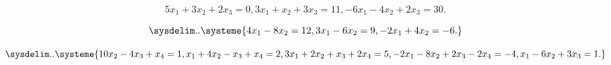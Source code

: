 \documentclass[english,12pt,a4paper]{scrartcl}
\newenvironment{modenumerate}
  {\enumerate\setupmodenumerate}
  {\endenumerate}
\newif\ifmoditem
\newcommand{\setupmodenumerate}{%
  \global\moditemfalse
  \let\origmakelabel\makelabel
  \def\moditem##1{\global\moditemtrue\def\mesymbol{##1}\item}%
  \def\makelabel##1{%
  \origmakelabel{##1\ifmoditem\rlap{\mesymbol}\fi\enspace}%
\global\moditemfalse}%
}
\begin{document}
\begin{modenumerate}
\begin{multicols}{2}[\setlength{\columnseprule}{0pt}]
\begin{modenumerate}
\[{              5x_1 + 3x_2 + 2x_3 = 0,
              3x_1 + x_2 + 3x_3 = 11,
              -6x_1 - 4x_2 + 2x_3 = 30.
            }
          \]
        \moditem{*}
          \[
            \sysdelim..\systeme{
              4x_1 - 8x_2 = 12,
              3x_1 - 6x_2 = 9,
              -2x_1 + 4x_2 = -6.
            }
          \]
        \item
          \[
            \sysdelim..\systeme{
              10x_2 - 4x_3 + x_4 = 1,
              x_1 + 4x_2 - x_3 + x_4 = 2,
              3x_1 + 2x_2 + x_3 + 2x_4 = 5,
              -2x_1 - 8x_2 + 2x_3 -2x_4 = -4,
              x_1 - 6x_2 + 3x_3 = 1.
            }
          \]
      \end{modenumerate}
    \end{multicols}
\end{modenumerate}
\end{document}

